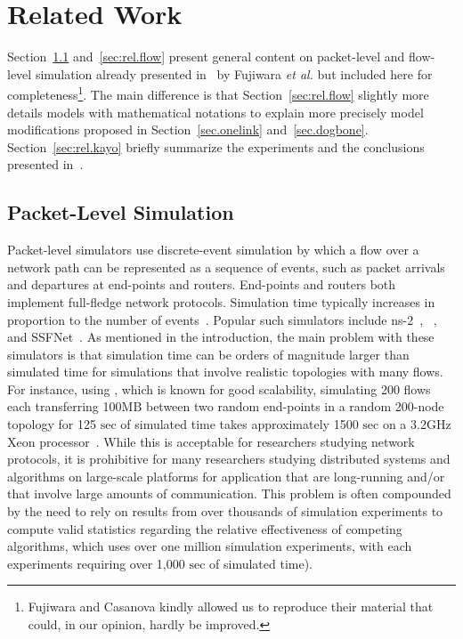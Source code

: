 \documentclass{sig-alternate}
\def\etal{\emph{et al.}\xspace}
\def\sec{\ensuremath{\text{sec}}\xspace}%
\def\MB{\ensuremath{\text{MB}}\xspace}%
\begin{document}
\section{Related Work}
\label{sec.related}

Section~\ref{sec:rel.packet} and~\ref{sec:rel.flow} present general
content on packet-level and flow-level simulation already presented
in~\cite{nstools07} by Fujiwara \etal but included here for
completeness\footnote{Fujiwara and Casanova kindly allowed us to
  reproduce their material that could, in our opinion, hardly be
  improved.}. The main difference is that
Section~\ref{sec:rel.flow} slightly more details models
with mathematical notations to explain more precisely model
modifications proposed in Section~\ref{sec.onelink}
and~\ref{sec.dogbone}. Section~\ref{sec:rel.kayo} briefly summarize
the experiments and the conclusions presented in~\cite{nstools07}.

\subsection{Packet-Level Simulation}
\label{sec:rel.packet}
Packet-level simulators use discrete-event simulation by which a flow
over a network path can be represented as a sequence of events, such
as packet arrivals and departures at end-points and
routers. End-points and routers both implement full-fledge network
protocols. Simulation time typically increases in proportion to the
number of events~\cite{REF_15}.  Popular such simulators include
ns-2~\cite{REF_22}, \gtnets~\cite{REF_29}, and
SSFNet~\cite{REF_6}. As mentioned in the introduction, the main
problem with these simulators is that simulation time can be orders of
magnitude larger than simulated time for simulations that involve
realistic topologies with many flows. For instance, using \gtnets, which
is known for good scalability, simulating 200 flows each transferring
100\MB between two random end-points in a random 200-node topology for
125 \sec of simulated time takes approximately 1500 \sec on a 3.2GHz
Xeon processor~\cite{nstools07}. While this is acceptable for
researchers studying network protocols, it is prohibitive for many
researchers studying distributed systems and algorithms on large-scale
platforms for application that are long-running and/or that involve
large amounts of communication. This problem is often compounded by
the need to rely on results from over thousands of simulation
experiments to compute valid statistics regarding the relative
effectiveness of competing algorithms, which uses over one million
simulation experiments, with each experiments requiring over 1,000
\sec of simulated time).
\end{document}

